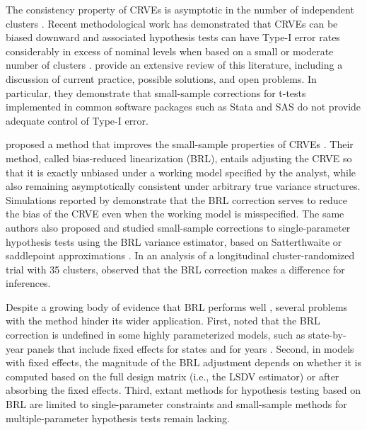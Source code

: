 \documentclass[12pt]{article}\usepackage[]{graphicx}\usepackage[]{color}
\begin{document}
The consistency property of CRVEs is asymptotic in the number of independent clusters \citep{Wooldridge2003cluster}.
Recent methodological work has demonstrated that CRVEs can be biased downward and associated hypothesis tests can have Type-I error rates considerably in excess of nominal levels when based on a small or moderate number of clusters \citep[e.g.,][]{MacKinnon2016wild}.
\citet{Cameron2015practitioners} provide an extensive review of this literature, including a discussion of current practice, possible solutions, and open problems. 
In particular, they demonstrate that small-sample corrections for t-tests implemented in common software packages such as Stata and SAS do not provide adequate control of Type-I error. 

\citet{Bell2002bias} proposed a method that improves the small-sample properties of CRVEs \citep[see also][]{McCaffrey2001generalizations}. 
Their method, called bias-reduced linearization (BRL), entails adjusting the CRVE so that it is exactly unbiased under a working model specified by the analyst, while also remaining asymptotically consistent under arbitrary true variance structures. 
Simulations reported by \citet{Bell2002bias} demonstrate that the BRL correction serves to reduce the bias of the CRVE even when the working model is misspecified. 
The same authors also proposed and studied small-sample corrections to single-parameter hypothesis tests using the BRL variance estimator, based on Satterthwaite \citep{Bell2002bias} or saddlepoint approximations \citep{McCaffrey2006improved}. 
In an analysis of a longitudinal cluster-randomized trial with 35 clusters, \citet{Angrist2009effects} observed that the BRL correction makes a difference for inferences. 

Despite a growing body of evidence that BRL performs well \citep[e.g.,][]{Imbens2015robust}, several problems with the method hinder its wider application. 
First, \citet{Angrist2009mostly} noted that the BRL correction is undefined in some highly parameterized models, such as state-by-year panels that include fixed effects for states and for years \citep[see also][]{Young2016improved}.
Second, in models with fixed effects, the magnitude of the BRL adjustment depends on whether it is computed based on the full design matrix (i.e., the LSDV estimator) or after absorbing the fixed effects.  
Third, extant methods for hypothesis testing based on BRL are limited to single-parameter constraints \citep{Bell2002bias, McCaffrey2006improved} and small-sample methods for multiple-parameter hypothesis tests remain lacking.
\end{document}

